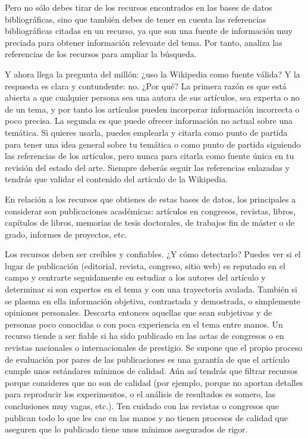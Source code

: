 Pero no sólo debes tirar de los recursos encontrados en las bases de datos bibliográficas, sino que también debes de tener en cuenta las referencias bibliográficas citadas en un recurso, ya que son una fuente de información muy preciada para obtener información relevante del tema. Por tanto, analiza las referencias de los recursos para ampliar la búsqueda.

Y ahora llega la pregunta del millón: ¿uso la Wikipedia como fuente válida? Y la respuesta es clara y contundente: no. ¿Por qué? La primera razón es que está abierta a que cualquier persona sea una autora de sus artículos, sea experta o no de un tema, y por tanto los artículos pueden incorporar información incorrecta o poco precisa. La segunda es que puede ofrecer información no actual sobre una temática. Si quieres usarla, puedes emplearla y citarla como punto de partida para tener una idea general sobre tu temática o como punto de partida siguiendo las referencias de los artículos, pero nunca para citarla como fuente única en tu revisión del estado del arte. Siempre deberás seguir las referencias enlazadas y tendrás que validar el contenido del artículo de la Wikipedia. 

En relación a los recursos que obtienes de estas bases de datos, los principales a considerar son publicaciones académicas: artículos en congresos, revistas, libros, capítulos de libros, memorias de tesis doctorales, de trabajos fin de máster o de grado, informes de proyectos, etc. 

Los recursos deben ser creíbles y confiables. ¿Y cómo detectarlo? Puedes ver si el lugar de publicación (editorial, revista, congreso, sitio web) es reputado en el campo y centrarte seguidamente en estudiar a los autores del artículo y determinar si son expertos en el tema y con una trayectoria avalada. También si se plasma en ella información objetiva, contrastada y demostrada, o simplemente opiniones personales. Descarta entonces aquellas que sean subjetivas y de personas poco conocidas o con poca experiencia en el tema entre manos.  Un recurso tiende a ser fiable si ha sido publicado en las actas de congresos o en revistas nacionales o internacionales de prestigio. Se supone que el propio proceso de evaluación por pares de las publicaciones es una garantía de que el artículo cumple unos estándares mínimos de calidad. Aún así tendrás que filtrar recursos porque consideres que no son de calidad (por ejemplo, porque no aportan detalles para reproducir los experimentos, o el análisis de resultados es somero, las conclusiones muy vagas, etc.). Ten cuidado con las revistas o congresos que publican todo lo que les cae en las manos y no tienen procesos de calidad que aseguren que lo publicado tiene unos mínimos asegurados de rigor.

